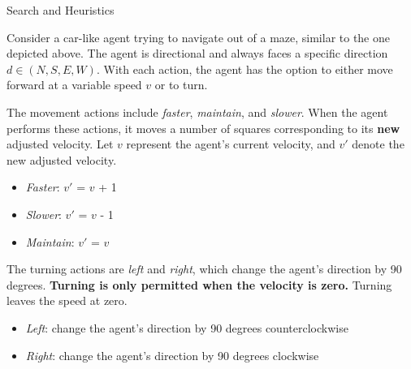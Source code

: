 \begin{problem} {Search and Heuristics}

\begin{center}
\end{center}

Consider a car-like agent trying to navigate out of a maze, similar to the one depicted above. The agent is directional and always faces a specific direction \(d \in (N, S, E, W)\). With each action, the agent has the option to either move forward at a variable speed \(v\) or to turn.

The movement actions include \textit{faster}, \textit{maintain}, and \textit{slower}. When the agent performs these actions, it moves a number of squares corresponding to its \textbf{new} adjusted velocity. Let \(v\) represent the agent's current velocity, and \(v'\) denote the new adjusted velocity.

\begin{itemize}[noitemsep,topsep=0pt]\vspace{-0.3cm}
    \item \textit{Faster}: $v'$ = $v$ + 1
    \item \textit{Slower}: $v'$ = $v$ - 1
    \item \textit{Maintain}: $v'$ = $v$
\end{itemize}

The turning actions are \textit{left} and \textit{right}, which change the agent’s direction by 90 degrees. \textbf{Turning is only permitted when the velocity is zero.} Turning leaves the speed at zero. 
\begin{itemize}[noitemsep,topsep=0pt]\vspace{-0.3cm}
    \item \textit{Left}: change the agent’s direction by 90 degrees counterclockwise
    \item \textit{Right}: change the agent’s direction by 90 degrees clockwise
\end{itemize}


\end{problem}
